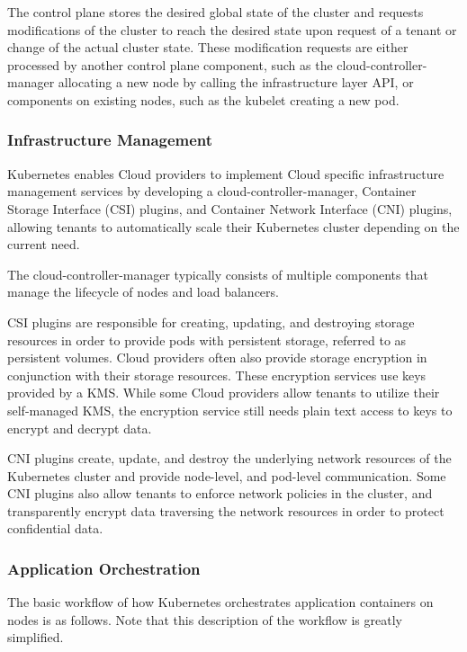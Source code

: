 \begin{description}
    The control plane stores the desired global state of the cluster and
    requests modifications of the cluster to reach the desired state upon
    request of a tenant or change of the actual cluster state. These
    modification requests are either processed by another control plane
    component, such as the cloud-controller-manager allocating a new node by
    calling the infrastructure layer API, or components on existing nodes, such
    as the kubelet creating a new pod.
\end{description}

\subsubsection{Infrastructure Management}

Kubernetes enables Cloud providers to implement Cloud specific infrastructure
management services by developing a cloud-controller-manager, Container Storage
Interface (CSI) plugins, and Container Network Interface (CNI) plugins, allowing
tenants to automatically scale their Kubernetes cluster depending on the current
need.

The cloud-controller-manager typically consists of multiple components that
manage the lifecycle of nodes and load balancers.

CSI plugins are responsible for creating, updating, and destroying storage
resources in order to provide pods with persistent storage, referred to as
persistent volumes. Cloud providers often also provide storage encryption in
conjunction with their storage resources. These encryption services use keys
provided by a KMS. While some Cloud providers allow tenants to utilize their
self-managed KMS, the encryption service still needs plain text access to keys
to encrypt and decrypt data.

CNI plugins create, update, and destroy the underlying network resources of the
Kubernetes cluster and provide node-level, and pod-level communication. Some CNI
plugins also allow tenants to enforce network policies in the cluster, and
transparently encrypt data traversing the network resources in order to protect
confidential data.

\subsubsection{Application Orchestration}

The basic workflow of how Kubernetes orchestrates application containers on
nodes is as follows. Note that this description of the workflow is greatly
simplified.

